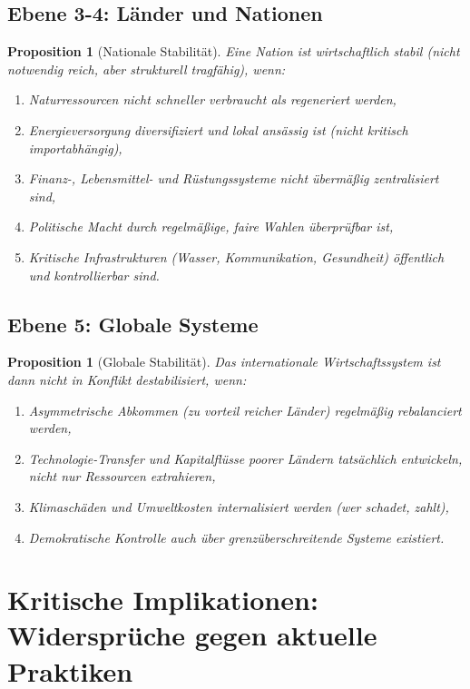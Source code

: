 \documentclass[a4paper, 12pt, twoside, openright]{report}
\newtheorem{proposition}[theorem]{Proposition}
\theoremstyle{definition}
\theoremstyle{definition}
\begin{document}
\subsection{Ebene 3-4: Länder und Nationen}

\begin{proposition}[Nationale Stabilität]
Eine Nation ist wirtschaftlich stabil (nicht notwendig reich, aber strukturell tragfähig), wenn:
\begin{enumerate}
\item Naturressourcen nicht schneller verbraucht als regeneriert werden,
\item Energieversorgung diversifiziert und lokal ansässig ist (nicht kritisch importabhängig),
\item Finanz-, Lebensmittel- und Rüstungssysteme nicht übermäßig zentralisiert sind,
\item Politische Macht durch regelmäßige, faire Wahlen überprüfbar ist,
\item Kritische Infrastrukturen (Wasser, Kommunikation, Gesundheit) öffentlich und kontrollierbar sind.
\end{enumerate}
\end{proposition}

\subsection{Ebene 5: Globale Systeme}

\begin{proposition}[Globale Stabilität]
Das internationale Wirtschaftssystem ist dann nicht in Konflikt destabilisiert, wenn:
\begin{enumerate}
\item Asymmetrische Abkommen (zu vorteil reicher Länder) regelmäßig rebalanciert werden,
\item Technologie-Transfer und Kapitalflüsse poorer Ländern tatsächlich entwickeln, nicht nur Ressourcen extrahieren,
\item Klimaschäden und Umweltkosten internalisiert werden (wer schadet, zahlt),
\item Demokratische Kontrolle auch über grenzüberschreitende Systeme existiert.
\end{enumerate}
\end{proposition}

\section{Kritische Implikationen: Widersprüche gegen aktuelle Praktiken}
\end{document}
